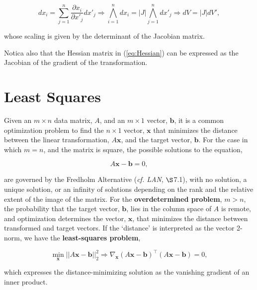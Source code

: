 \documentclass[12pt, twoside, draft]{article}
\begin{document}
\begin{equation}\label{eq:total_differential}
dx_i = \sum_{j=1}^n \frac{\partial x_i}{\partial x'_j} dx'_j \Rightarrow \bigwedge_{i=1}^n dx_i = |J| \bigwedge_{j=1}^n dx'_j \Rightarrow dV = |J| dV',
\end{equation}

whose scaling is given by the determinant of the Jacobian matrix.

Notica also that the Hessian matrix in (\ref{eq:Hessian}) can be expressed as the Jacobian of the gradient of the transformation.

\section{Least Squares}\label{sec:least_squares}
Given an $m \times n$ data matrix, $A$, and an $m \times 1$ vector, $\mathbf{b}$, it is a common optimization problem to find the $n \times 1$ vector, $\mathbf{x}$ that minimizes the distance between the linear transformation, $A\mathbf{x}$, and the target vector, $\mathbf{b}$.  For the case in which $m = n$, and the matrix is square, the possible solutions to the equation,

\begin{equation}
A \mathbf{x} - \mathbf{b} = 0,
\end{equation}

are governed by the Fredholm Alternative (\textit{cf. LAN}, $\S$7.1), with no solution, a unique solution, or an infinity of solutions depending on the rank and the relative extent of the image of the matrix.  For the \textbf{overdetermined problem}, $m > n$, the probability that the target vector, $\mathbf{b}$, lies in the column space of $A$ is remote, and optimization determines the vector, $\mathbf{x}$, that minimizes the distance between transformed and target vectors.  If the `distance' is interpreted as the vector 2-norm, we have the \textbf{least-squares problem},

\begin{equation}\label{eq:least_squares}
\min_{\mathbf{x}} || A \mathbf{x} - \mathbf{b} ||_2^2 \Rightarrow \nabla_\mathbf{x} \left( A \mathbf{x} - \mathbf{b} \right)^\top\left( A \mathbf{x} - \mathbf{b} \right) = 0,
\end{equation}

which expresses the distance-minimizing solution as the vanishing gradient of an inner product.
\end{document}
